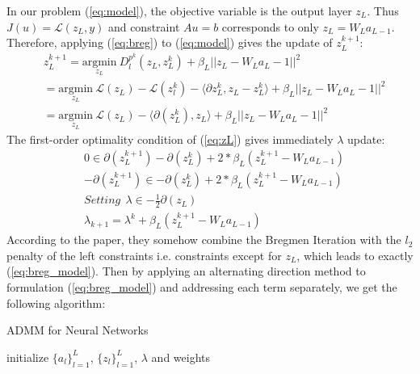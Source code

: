 \documentclass[letterpaper, 10 pt, conference]{ieeeconf}  %
\begin{document}
In our problem (\ref{eq:model}), the objective variable is the output layer $z_L$. Thus $J(u) = \mathcal{L}(z_L, y)$ and constraint $Au = b$ corresponds to only $z_L = W_La_{L-1}$. Therefore, applying (\ref{eq:breg}) to (\ref{eq:model}) gives the update of $z_L^{k+1}$:
\begin{equation*}
\begin{aligned}
&z_L^{k+1} = \underset{z_L}{\text{argmin}} \: D_l^{p^k}(z_L, z_L^k) + \beta_L||z_L - W_La_L-1||^2\\
&= \underset{z_L}{\text{argmin}} \: \mathcal{L}(z_L) -\mathcal{L}(z_l^k) 
 - \langle  \partial z_L^k, z_L - z_L^k \rangle +  \beta_L||z_L - W_La_L-1||^2\\
&= \underset{z_L}{\text{argmin}} \: \mathcal{L}(z_L) 
 - \langle \partial(z_L^k), z_L \rangle + \beta_L||z_L - W_La_L-1||^2
 \label{eq:zL}
\end{aligned} 
\end{equation*}
The first-order optimality condition of (\ref{eq:zL}) gives immediately $\lambda$ update:
\begin{equation*}
\begin{aligned}
&0 \in \partial(z_L^{k+1}) -  \partial(z_L^k) + 2 * \beta_L(z_L^{k+1} - W_La_{L-1}) \\
&- \partial(z_L^{k+1}) \in - \partial(z_L^k) +  2 * \beta_L(z_L^{k+1} - W_La_{L-1}) \\
&Setting \: \:  \lambda \in-  \frac{1}{2} \partial(z_L) \\
&\lambda_{k+1} = \lambda^k + \beta_L(z_L^{k+1} - W_La_{L-1})
\label{eq:zL}
\end{aligned} 
\end{equation*}
According to the paper, they somehow combine the Bregmen Iteration with the $l_2$ penalty of the left constraints i.e. constraints except for $z_L$, which leads to exactly (\ref{eq:breg_model}). Then by applying an alternating direction method to formulation (\ref{eq:breg_model}) and addressing each term separately, we get the following algorithm:
\begin{algorithm} 
\caption{ADMM for Neural Networks}
\label{alg:goldADMM}
initialize $\{a_l\}^{L}_{l=1}$, $\{z_l\}^{L}_{l=1}$, $\lambda$ and weights\\

\end{algorithm}
\end{document}

